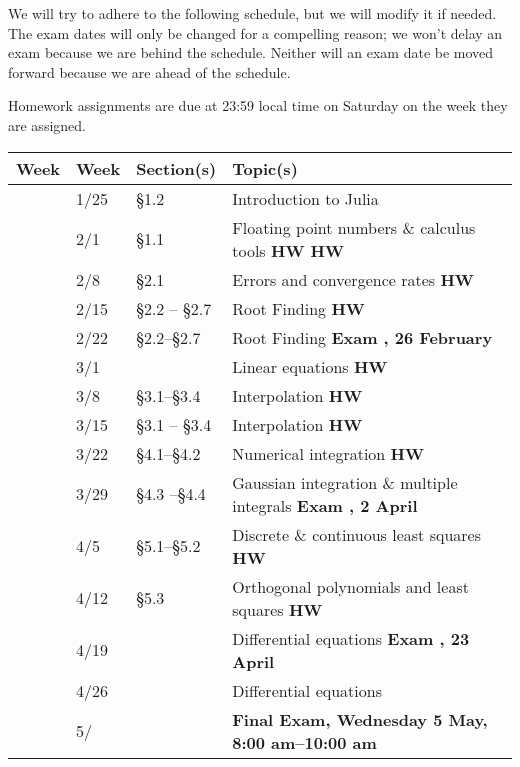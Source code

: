 \documentclass[12pt,fullpage]{article}
\newcounter{qz}\setcounter{qz}{0}
\newcommand{\qz}{\setcounter{qz}{\value{qz}+1}\textbf{ \theqz}}
\newcounter{ex}\setcounter{ex}{0}
\newcommand{\ex}{%
\setcounter{ex}{\value{ex}+1}
Exam \theex}
\newcounter{wk}\setcounter{wk}{0}
\newcommand{\wk}{%
\setcounter{wk}{\value{wk}+1}
\thewk \,\,}
\begin{document}
We will try to adhere to the following schedule, but we will modify it
if needed. The exam dates will only be changed for a compelling
reason; we won't delay an exam because we are behind the
schedule. Neither will an exam date be moved forward because we are
ahead of the schedule.

Homework assignments are due at 23:59 local time on Saturday on the week they are assigned. 

\vspace{0.1in}

\begin{center}

\begin{tabular}  {|l|l|l|l|}
\hline
{\bf Week}  & {\bf Week} &  {\bf Section(s)} & {\bf Topic(s)} \\
\hline \hline 
\wk    & 1/25 &    \S1.2   &   Introduction to Julia   \hfill \\
\wk    & 2/1 & \S1.1      &  Floating point numbers \& calculus tools   \hfill \textbf{HW  \qz  HW \qz} \\
\wk    & 2/8 &    \S2.1 & Errors and convergence rates    \hfill \textbf{HW  \qz} \\
\wk    & 2/15  & \S2.2 -- \S2.7 &  Root Finding   \hfill  \textbf{HW \qz} \\
\wk    & 2/22 &  \S2.2--\S2.7   &  Root Finding    \hfill \textbf{\ex\-\-, 26 February}   \\
\wk    & 3/1    &  &  Linear equations  \hfill  \textbf{HW  \qz }  \\
\wk    & 3/8     & \S3.1--\S3.4 & Interpolation \hfill \textbf{ HW  \qz }   \\
\wk   & 3/15   & \S3.1 -- \S3.4   &   Interpolation   \hfill \textbf{ HW  \qz} \\
\wk  &  3/22    & \S4.1--\S4.2 &  Numerical  integration  \hfill \textbf{HW  \qz}     \hfill \\
\wk &  3/29     &   \S4.3 --\S4.4 &   Gaussian integration \& multiple integrals    \hfill \textbf{\ex\-\-, 2 April}  \\
\wk  & 4/5 &   \S5.1--\S5.2 & Discrete \& continuous least squares  \hfill \textbf{HW    \qz} \\
\wk   & 4/12  & \S5.3 &  Orthogonal polynomials and least squares  \hfill \textbf{HW \qz}   \\
\wk   & 4/19   &   & Differential equations \hfill  \textbf{ \ex, 23 April}     \\
\wk   & 4/26   &     & Differential equations   \hfill \\
\wk   & 5/       &  &   \textbf{Final Exam, Wednesday 5 May, 8:00 am--10:00 am} \\ \hline
\end{tabular}
\end{center}
\end{document}
